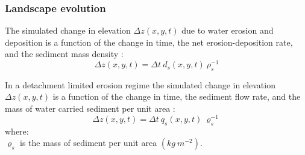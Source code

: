 \documentclass[esurf, manuscript]{copernicus}
\begin{document}

\subsubsection{Landscape evolution}

The simulated change in elevation $\Delta z(x,y,t)$ due to water erosion and deposition
is a function of
the change in time, the net erosion-deposition rate, and the sediment mass density 
\citep{Mitasova2013}:
\begin{equation}
\label{eq:evolution} 
{\Delta z(x,y,t) = \Delta t ~ d_s(x,y,t) ~ \rho_s^{-1} }
\end{equation}

In a detachment limited erosion regime
the simulated change in elevation $\Delta z(x,y,t)$
is a function of
the change in time, the sediment flow rate, and the mass of water carried sediment per unit area
\citep{Mitasova2013}:
\begin{equation}
\label{eq:flux_evolution} 
{\Delta z(x,y,t) = \Delta t ~ q_s(x,y,t) ~ \varrho_s^{-1} } 
\end{equation}
{\small
\noindent
where: \\
\noindent
\hspace*{0.5em} $\varrho_s$ is the mass of sediment per unit area $(kg ~ m^{-2})$.\\
}

\end{document}
